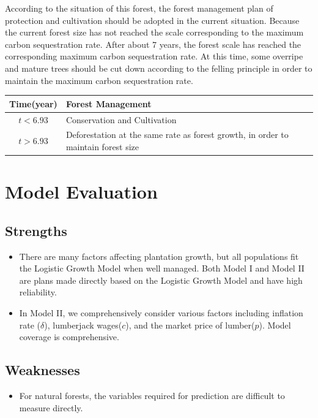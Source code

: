 \documentclass[12pt]{article}
\begin{document}
According to the situation of this forest, the forest management plan of
protection and cultivation should be adopted in the current situation. Because
the current forest size has not reached the scale corresponding to the maximum
carbon sequestration rate. After about 7 years, the forest scale has reached
the corresponding maximum carbon sequestration rate. At this time, some
overripe and mature trees should be cut down according to the felling principle
in order to maintain the maximum carbon sequestration rate.
\begin{table}[htb!]
    \centering
    \begin{tabular}{c>{\centering\arraybackslash}p{14cm}}
        \toprule
        \textbf{Time(year)} & \textbf{Forest Management}                                                        \\
        \midrule
        $t<6.93$            & Conservation and Cultivation                                                      \\
        \midrule
        $t>6.93$            & Deforestation at the same rate as forest growth, in order to maintain forest size \\
        \bottomrule
    \end{tabular}
\end{table}

\section{Model Evaluation}
\subsection{Strengths}
\begin{itemize}
    \item There are many factors affecting plantation growth, but all populations fit the
          Logistic Growth Model when well managed. Both Model I and Model II are plans
          made directly based on the Logistic Growth Model and have high reliability.  %
    \item In Model II, we comprehensively consider various factors including inflation
          rate ($\delta$), lumberjack wages($c$), and the market price of lumber($p$).
          Model coverage is comprehensive. %
\end{itemize}
\subsection{Weaknesses}
\begin{itemize}
    \item For natural forests, the variables required for prediction are difficult to
          measure directly.
\end{itemize}
\end{document}
